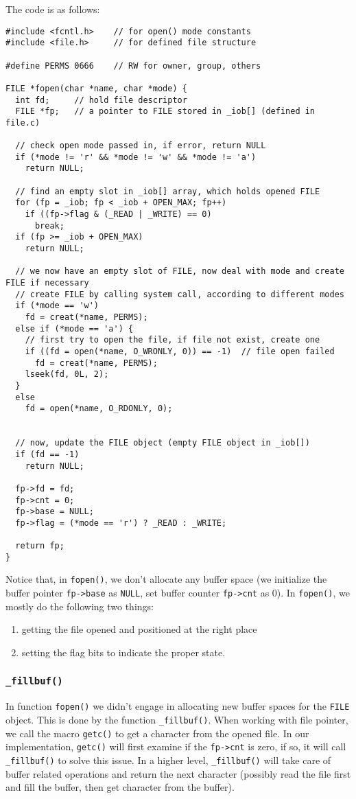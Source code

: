 \documentclass[11pt]{article}
\begin{document}
The code is as follows:
\begin{verbatim}
#include <fcntl.h>    // for open() mode constants
#include <file.h>     // for defined file structure

#define PERMS 0666    // RW for owner, group, others

FILE *fopen(char *name, char *mode) {
  int fd;     // hold file descriptor
  FILE *fp;   // a pointer to FILE stored in _iob[] (defined in file.c)

  // check open mode passed in, if error, return NULL 
  if (*mode != 'r' && *mode != 'w' && *mode != 'a')
    return NULL;

  // find an empty slot in _iob[] array, which holds opened FILE
  for (fp = _iob; fp < _iob + OPEN_MAX; fp++)
    if ((fp->flag & (_READ | _WRITE) == 0)
      break;
  if (fp >= _iob + OPEN_MAX)
    return NULL;

  // we now have an empty slot of FILE, now deal with mode and create FILE if necessary
  // create FILE by calling system call, according to different modes
  if (*mode == 'w')
    fd = creat(*name, PERMS);
  else if (*mode == 'a') {
    // first try to open the file, if file not exist, create one
    if ((fd = open(*name, O_WRONLY, 0)) == -1)  // file open failed
      fd = creat(*name, PERMS);
    lseek(fd, 0L, 2);
  }
  else
    fd = open(*name, O_RDONLY, 0);


  // now, update the FILE object (empty FILE object in _iob[])
  if (fd == -1)
    return NULL;

  fp->fd = fd;
  fp->cnt = 0;
  fp->base = NULL;
  fp->flag = (*mode == 'r') ? _READ : _WRITE;

  return fp;
}
\end{verbatim}

Notice that, in \texttt{fopen()}, we don't allocate any buffer space (we initialize the buffer pointer \texttt{fp->base}  as \texttt{NULL}, set buffer counter \texttt{fp->cnt} as 0). In \texttt{fopen()}, we mostly do the following two things:
\begin{enumerate}
\item getting the file opened and positioned at the right place
\item setting the flag bits to indicate the proper state.
\end{enumerate}
\subsubsection{\texttt{\_fillbuf()}}
\label{sec:org35d4afb}
In function \texttt{fopen()} we didn't engage in allocating new buffer spaces for the \texttt{FILE} object. This is done by the function \texttt{\_fillbuf()}. When working with file pointer, we call the macro \texttt{getc()} to get a character from the opened file. In our implementation, \texttt{getc()} will first examine if the \texttt{fp->cnt} is zero, if so, it will call \texttt{\_fillbuf()} to solve this issue. In a higher level, \texttt{\_fillbuf()} will take care of buffer related operations and return the next character (possibly read the file first and fill the buffer, then get character from the buffer).
\end{document}
